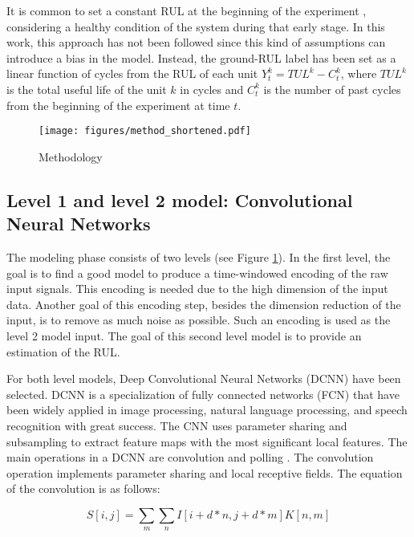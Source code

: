 \documentclass[PHM, 2021]{PHMSociety}
\begin{document}
It is common to set a constant RUL at the beginning of the experiment \cite{li2020remaining}, considering a healthy condition of the system during that early stage. In this work, this approach has not been followed since this kind of assumptions can introduce a bias in the model. Instead, the ground-RUL label has been set as a linear function of cycles from the RUL of each unit $Y^k_t = TUL^k -  C^k_t$, where $TUL^k$ is the total useful life of the unit $k$ in cycles and $C^k_t$ is the number of past cycles from the beginning of the experiment at time $t$.

\begin{figure}[t]
\centering
\texttt{[image: figures/method\_shortened.pdf]}
\caption{Methodology}
\label{fig:method}
\end{figure}

\subsection{Level 1 and level 2 model: Convolutional Neural Networks}

The modeling phase consists of two levels (see Figure \ref{fig:method}). In the first level, the goal is to find a good model to produce a time-windowed encoding of the raw input signals. This encoding is needed due to the high dimension of the input data. Another goal of this encoding step, besides the dimension reduction of the input, is to remove as much noise as possible. Such an encoding is used as the level 2 model input. The goal of this second level model is to provide an estimation of the RUL. 



For both level models, Deep Convolutional Neural Networks (DCNN) have been selected. DCNN is a specialization of fully connected networks (FCN) that have been widely applied in image processing, natural language processing, and speech recognition with great success. The CNN uses parameter sharing and subsampling to extract feature maps with the most significant local features. The main operations in a DCNN are convolution and polling . The convolution operation implements parameter sharing and local receptive fields. The equation of the convolution is as follows:

\begin{equation}
S\left [ i,j \right ] = \sum_m \sum_n I \left [ i + d*n,j + d*m \right ] K \left [ n, m \right ]
\end{equation}
\end{document}
